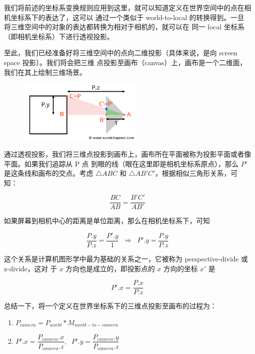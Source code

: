 \documentclass[12pt]{article}
\begin{document}
\indent{}我们将前述的坐标系变换规则应用到这里，就可以知道定义在世界空间中的点在相机坐标系下的表达了，这可以
通过一个类似于 world-to-local 的转换得到。一旦将三维空间中的对象的表达都转换为相对于相机的，就可以在
同一 local 坐标系（即相机坐标系）下进行透视投影。

\indent{}至此，我们已经准备好将三维空间中的点向二维投影（具体来说，是向 screen space 投影）。我们将会把三维
点投影至画布（canvas）上，画布是一个二维面，我们在其上绘制三维场景。

\begin{figure}[h]
\centering
\includegraphics[width=6cm]{./imgs/box-setup4.png}
\end{figure}

\indent{}通过透视投影，我们将三维点投影到画布上，画布所在平面被称为投影平面或者像平面。如果我们追踪从 P 点
到眼的线（眼在这里即是相机坐标系原点），那么 $P'$ 是这条线和画布的交点。考虑 $\triangle ABC$ 和
$\triangle AB'C'$，根据相似三角形关系，可知：

\begin{displaymath}
\frac{BC}{AB} = \frac{B'C'}{AB'}
\end{displaymath}

\noindent{}如果屏幕到相机中心的距离是单位距离，那么在相机坐标系下，可知

\begin{displaymath}
\frac{P.y}{P.z} = \frac{P'.y}{1} \;\;\Rightarrow \;\; P'.y = \frac{P.y}{P.z}
\end{displaymath}

\noindent{}这个关系是计算机图形学中最为基础的关系之一，它被称为 perspective-divide 或 z-divide，这对
于 $x$ 方向也是成立的，即投影点的 $x$ 方向的坐标 $x'$ 是

\begin{displaymath}
P'.x = \frac{P.x}{P.z}
\end{displaymath}

\noindent{}总结一下，将一个定义在世界坐标系下的三维点投影至画布的过程为：
\begin{enumerate}
\item $P_{camera} = P_{world} * M_{world-to-camera}$
\item $P'.x = \dfrac{P_{camera}.x}{P_{camera}.z}, \;\; P'.y = \dfrac{P_{camera}.y}{P_{camera}.z}$
\end{enumerate}
\end{document}
